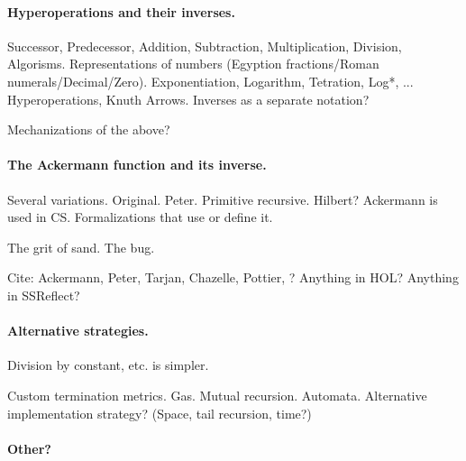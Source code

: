\label{sec:related}

\paragraph{Hyperoperations and their inverses.}

Successor, Predecessor, Addition, Subtraction, Multiplication, Division, Algorisms.  Representations of numbers (Egyption fractions/Roman numerals/Decimal/Zero).  Exponentiation, Logarithm, Tetration, Log*, ...   Hyperoperations, Knuth Arrows.  Inverses as a separate notation?

Mechanizations of the above?

\paragraph{The Ackermann function and its inverse.}

Several variations.  Original.  Peter.  Primitive recursive.  Hilbert?  Ackermann is used in CS.  Formalizations that use or define it.

The grit of sand.  The bug.

Cite: Ackermann, Peter, Tarjan, Chazelle, Pottier, ?  Anything in HOL?  Anything in SSReflect?

\paragraph{Alternative strategies.}

Division by constant, etc. is simpler.

Custom termination metrics.  Gas.  Mutual recursion.  Automata.  Alternative implementation strategy?  (Space, tail recursion, time?)

\paragraph{Other?}